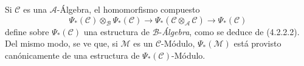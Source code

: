 \begin{env}[4.2.4]
\label{0.4.2.4-fr}
Si $\mathcal{C}$ es una $\mathcal{A}$-Álgebra, el homomorfismo compuesto
\[
  \Psi_*(\mathcal{C})\otimes_{\mathcal{B}}\Psi_*(\mathcal{C})
  \longrightarrow
  \Psi_*(\mathcal{C}\otimes_{\mathcal{A}}\mathcal{C})
  \longrightarrow
  \Psi_*(\mathcal{C})
\]
define sobre $\Psi_*(\mathcal{C})$ una estructura de
$\mathcal{B}$-\emph{Álgebra}, como se deduce de (4.2.2.2). Del mismo modo,
se ve que, si $\mathcal{M}$ es un $\mathcal{C}$-Módulo, $\Psi_*(\mathcal{M})$
está provisto canónicamente de una estructura de
$\Psi_*(\mathcal{C})$-Módulo.
\end{env}
